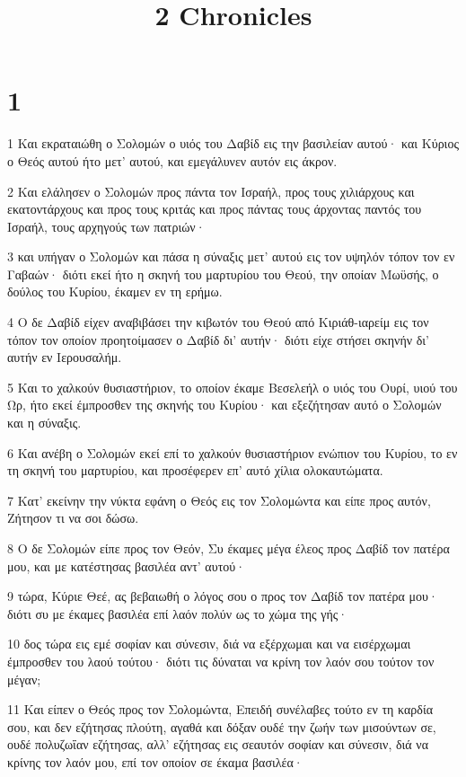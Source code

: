 

\title{2 Chronicles}


\chapter{1}

\par 1 Και εκραταιώθη ο Σολομών ο υιός του Δαβίδ εις την βασιλείαν αυτού· και Κύριος ο Θεός αυτού ήτο μετ' αυτού, και εμεγάλυνεν αυτόν εις άκρον.
\par 2 Και ελάλησεν ο Σολομών προς πάντα τον Ισραήλ, προς τους χιλιάρχους και εκατοντάρχους και προς τους κριτάς και προς πάντας τους άρχοντας παντός του Ισραήλ, τους αρχηγούς των πατριών·
\par 3 και υπήγαν ο Σολομών και πάσα η σύναξις μετ' αυτού εις τον υψηλόν τόπον τον εν Γαβαών· διότι εκεί ήτο η σκηνή του μαρτυρίου του Θεού, την οποίαν Μωϋσής, ο δούλος του Κυρίου, έκαμεν εν τη ερήμω.
\par 4 Ο δε Δαβίδ είχεν αναβιβάσει την κιβωτόν του Θεού από Κιριάθ-ιαρείμ εις τον τόπον τον οποίον προητοίμασεν ο Δαβίδ δι' αυτήν· διότι είχε στήσει σκηνήν δι' αυτήν εν Ιερουσαλήμ.
\par 5 Και το χαλκούν θυσιαστήριον, το οποίον έκαμε Βεσελεήλ ο υιός του Ουρί, υιού του Ωρ, ήτο εκεί έμπροσθεν της σκηνής του Κυρίου· και εξεζήτησαν αυτό ο Σολομών και η σύναξις.
\par 6 Και ανέβη ο Σολομών εκεί επί το χαλκούν θυσιαστήριον ενώπιον του Κυρίου, το εν τη σκηνή του μαρτυρίου, και προσέφερεν επ' αυτό χίλια ολοκαυτώματα.
\par 7 Κατ' εκείνην την νύκτα εφάνη ο Θεός εις τον Σολομώντα και είπε προς αυτόν, Ζήτησον τι να σοι δώσω.
\par 8 Ο δε Σολομών είπε προς τον Θεόν, Συ έκαμες μέγα έλεος προς Δαβίδ τον πατέρα μου, και με κατέστησας βασιλέα αντ' αυτού·
\par 9 τώρα, Κύριε Θεέ, ας βεβαιωθή ο λόγος σου ο προς τον Δαβίδ τον πατέρα μου· διότι συ με έκαμες βασιλέα επί λαόν πολύν ως το χώμα της γής·
\par 10 δος τώρα εις εμέ σοφίαν και σύνεσιν, διά να εξέρχωμαι και να εισέρχωμαι έμπροσθεν του λαού τούτου· διότι τις δύναται να κρίνη τον λαόν σου τούτον τον μέγαν;
\par 11 Και είπεν ο Θεός προς τον Σολομώντα, Επειδή συνέλαβες τούτο εν τη καρδία σου, και δεν εζήτησας πλούτη, αγαθά και δόξαν ουδέ την ζωήν των μισούντων σε, ουδέ πολυζωΐαν εζήτησας, αλλ' εζήτησας εις σεαυτόν σοφίαν και σύνεσιν, διά να κρίνης τον λαόν μου, επί τον οποίον σε έκαμα βασιλέα·
